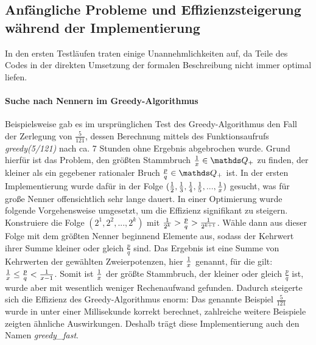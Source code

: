 \subsection{Anfängliche Probleme und Effizienzsteigerung während der Implementierung}
In den ersten Testläufen traten einige Unannehmlichkeiten auf, da Teile des Codes in der direkten Umsetzung der formalen Beschreibung nicht immer optimal liefen.

\paragraph{Suche nach Nennern im Greedy-Algorithmus}Beispielsweise gab es im ursprünglichen Test des Greedy-Algorithmus den Fall der Zerlegung von $\frac{5}{121}$, dessen Berechnung mittels des Funktionsaufrufs \emph{greedy(5/121)} nach ca. 7 Stunden ohne Ergebnis abgebrochen wurde. Grund hierfür ist das Problem, den größten Stammbruch $\uf{x} \in \Q_+$ zu finden, der kleiner als ein gegebener rationaler Bruch $\frac{p}{q} \in \Q_+$ ist. In der ersten Implementierung wurde dafür in der Folge $(\frac{1}{2}, \frac{1}{3}, \frac{1}{4}, \frac{1}{5},...,\frac{1}{x})$ gesucht, was für große Nenner offensichtlich sehr lange dauert. In einer Optimierung wurde folgende Vorgehensweise umgesetzt, um die Effizienz signifikant zu steigern. Konstruiere die Folge $(2^1, 2^2, ..., 2^k)$ mit $\frac{1}{2^k} > \frac{p}{q} > \frac{1}{2^{k+1}}$. Wähle dann aus dieser Folge mit dem größten Nenner beginnend Elemente aus, sodass der Kehrwert ihrer Summe kleiner oder gleich $\frac{p}{q}$ sind. Das Ergebnis ist eine Summe von Kehrwerten der gewählten Zweierpotenzen, hier $\frac{1}{x}$ genannt, für die gilt: $\frac{1}{x} \leq \frac{p}{q} < \frac{1}{x-1}$. Somit ist $\frac{1}{x}$ der größte Stammbruch, der kleiner oder gleich $\frac{p}{q}$ ist, wurde aber mit wesentlich weniger Rechenaufwand gefunden.
Dadurch steigerte sich die Effizienz des Greedy-Algorithmus enorm: Das genannte Beispiel $\frac{5}{121}$ wurde in unter einer Millisekunde korrekt berechnet, zahlreiche weitere Beispiele zeigten ähnliche Auswirkungen. Deshalb trägt diese Implementierung auch den Namen \emph{greedy\_fast}.%


